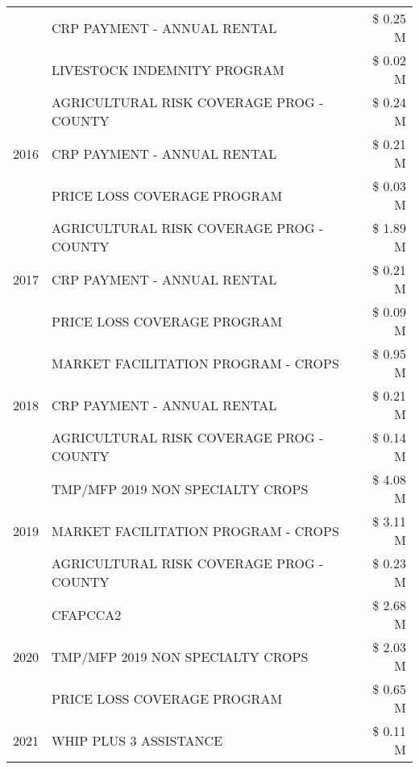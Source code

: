 \begin{tabular}{llr}
 & CRP PAYMENT - ANNUAL RENTAL & \$ 0.25 M \\
 & LIVESTOCK INDEMNITY PROGRAM & \$ 0.02 M \\
\cline{1-3}
\multirow[t]{3}{*}{2016} & AGRICULTURAL RISK COVERAGE PROG - COUNTY & \$ 0.24 M \\
 & CRP PAYMENT - ANNUAL RENTAL & \$ 0.21 M \\
 & PRICE LOSS COVERAGE PROGRAM & \$ 0.03 M \\
\cline{1-3}
\multirow[t]{3}{*}{2017} & AGRICULTURAL RISK COVERAGE PROG - COUNTY & \$ 1.89 M \\
 & CRP PAYMENT - ANNUAL RENTAL & \$ 0.21 M \\
 & PRICE LOSS COVERAGE PROGRAM & \$ 0.09 M \\
\cline{1-3}
\multirow[t]{3}{*}{2018} & MARKET FACILITATION PROGRAM - CROPS & \$ 0.95 M \\
 & CRP PAYMENT - ANNUAL RENTAL & \$ 0.21 M \\
 & AGRICULTURAL RISK COVERAGE PROG - COUNTY & \$ 0.14 M \\
\cline{1-3}
\multirow[t]{3}{*}{2019} & TMP/MFP 2019 NON SPECIALTY CROPS & \$ 4.08 M \\
 & MARKET FACILITATION PROGRAM - CROPS & \$ 3.11 M \\
 & AGRICULTURAL RISK COVERAGE PROG - COUNTY & \$ 0.23 M \\
\cline{1-3}
\multirow[t]{3}{*}{2020} & CFAPCCA2 & \$ 2.68 M \\
 & TMP/MFP 2019 NON SPECIALTY CROPS & \$ 2.03 M \\
 & PRICE LOSS COVERAGE PROGRAM & \$ 0.65 M \\
\cline{1-3}
2021 & WHIP PLUS 3 ASSISTANCE & \$ 0.11 M \\
\cline{1-3}
\bottomrule
\end{tabular}
